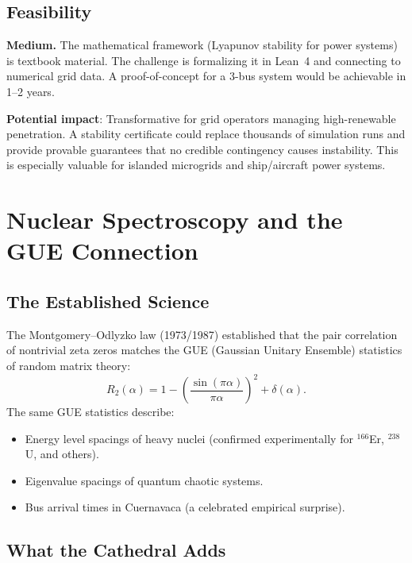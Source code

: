\documentclass[11pt,a4paper]{article}
\begin{document}
\subsection{Feasibility}

\textbf{Medium.} The mathematical framework (Lyapunov stability for
power systems) is textbook material. The challenge is formalizing it
in Lean~4 and connecting to numerical grid data. A proof-of-concept
for a 3-bus system would be achievable in 1--2 years.

\textbf{Potential impact}: Transformative for grid operators managing
high-renewable penetration. A stability certificate could replace
thousands of simulation runs and provide provable guarantees that
no credible contingency causes instability. This is especially
valuable for islanded microgrids and ship/aircraft power systems.

\section{Nuclear Spectroscopy and the GUE Connection}
\label{sec:nuclear}

\subsection{The Established Science}

The Montgomery--Odlyzko law (1973/1987) established that the
pair correlation of nontrivial zeta zeros matches the GUE
(Gaussian Unitary Ensemble) statistics of random matrix theory:
\[
  R_2(\alpha) = 1 - \left(\frac{\sin(\pi\alpha)}{\pi\alpha}\right)^2
  + \delta(\alpha).
\]
The same GUE statistics describe:
\begin{itemize}
  \item Energy level spacings of heavy nuclei (confirmed
    experimentally for $^{166}$Er, $^{238}$U, and others).
  \item Eigenvalue spacings of quantum chaotic systems.
  \item Bus arrival times in Cuernavaca (a celebrated empirical
    surprise).
\end{itemize}

\subsection{What the Cathedral Adds}
\end{document}
